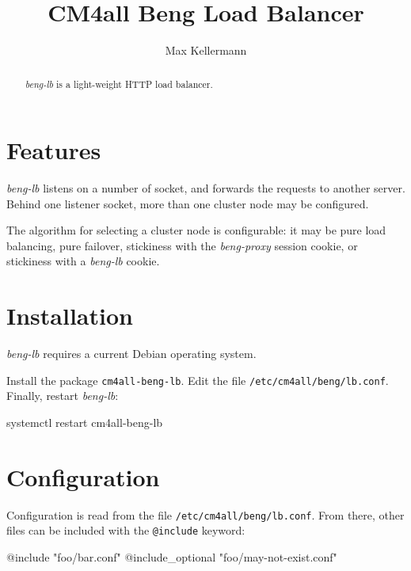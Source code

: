 \documentclass[a4paper,12pt]{article}
\begin{document}
\title{CM4all Beng Load Balancer}
\author{Max Kellermann}

\maketitle

\begin{abstract}
\emph{beng-lb} is a light-weight HTTP load balancer.
\end{abstract}

\setcounter{tocdepth}{2}
\tableofcontents
\newpage

\section{Features}

\emph{beng-lb} listens on a number of socket, and forwards the
requests to another server.  Behind one listener socket, more than one
cluster node may be configured.

The algorithm for selecting a cluster node is configurable: it may be
pure load balancing, pure failover, stickiness with the
\emph{beng-proxy} session cookie, or stickiness with a \emph{beng-lb}
cookie.


\section{Installation}

\emph{beng-lb} requires a current Debian operating system.

Install the package \texttt{cm4all-beng-lb}.  Edit the file
\texttt{/etc/cm4all/beng/lb.conf}.  Finally, restart
\emph{beng-lb}:

\begin{verbatim*}
systemctl restart cm4all-beng-lb
\end{verbatim*}

\section{Configuration}

Configuration is read from the file
\texttt{/etc/cm4all/beng/lb.conf}.  From there, other files can be
included with the \texttt{@include} keyword:

\begin{verbatim*}
@include "foo/bar.conf"
@include_optional "foo/may-not-exist.conf"
\end{verbatim*}
\end{document}
